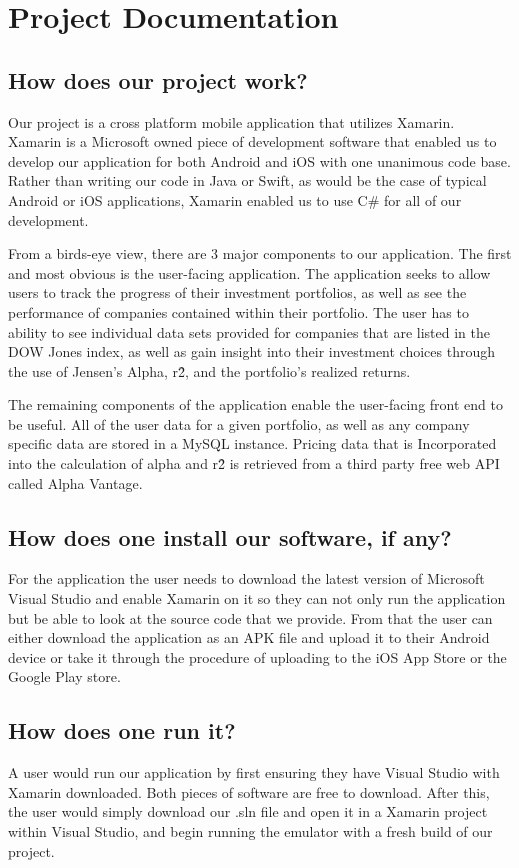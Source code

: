 \documentclass[onecolumn, draftclsnofoot,10pt, compsoc]{IEEEtran}
\begin{document}
\newpage
\section{Project Documentation}
\subsection{How does our project work?}
Our project is a cross platform mobile application that utilizes Xamarin. Xamarin is a Microsoft owned piece of development software that enabled us to develop our application for both Android and iOS with one unanimous code base. Rather than writing our code in Java or Swift, as would be the case of typical Android or iOS applications, Xamarin enabled us to use C\# for all of our development.

From a birds-eye view, there are 3 major components to our application. The first and most obvious is the user-facing application. The application seeks to allow users to track the progress of their investment portfolios, as well as see the performance of companies contained within their portfolio. The user has to ability to see individual data sets provided for companies that are listed in the DOW Jones index, as well as gain insight into their investment choices through the use of Jensen's Alpha, r\^2, and the portfolio's realized returns.

The remaining components of the application enable the user-facing front end to be useful. All of the user data for a given portfolio, as well as any company specific data are stored in a MySQL instance. Pricing data that is Incorporated into the calculation of alpha and r\^2 is retrieved from a third party free web API called Alpha Vantage. 


\subsection{How does one install our software, if any?}
For the application the user needs to download the latest version of Microsoft Visual Studio and enable Xamarin on it so they can not only run the application but be able to look at the source code that we provide. From that the user can either download the application as an APK file and upload it to their Android device or take it through the procedure of uploading to the iOS App Store or the Google Play store. 
\subsection{How does one run it?}
A user would run our application by first ensuring they have Visual Studio with Xamarin downloaded. Both pieces of software are free to download. After this, the user would simply download our .sln file and open it in a Xamarin project within Visual Studio, and begin running the emulator with a fresh build of our project.
\end{document}

